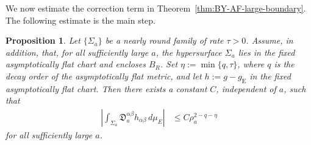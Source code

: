 \documentclass[10pt]{amsart}
\newcommand{\gE}{g_{\mathrm{E}}}
\theoremstyle{plain}
\newtheorem{proposition}[theorem]{Proposition}
\theoremstyle{remark}
\begin{document}
	We now estimate the correction term in
	Theorem~\ref{thm:BY-AF-large-boundary}. The following estimate is the
	main step.
	
	\begin{proposition}\label{prop:BY-nearly-round-correction}
		Let $\{\Sigma_a\}$ be a nearly round family of rate $\tau>0$.
		Assume, in addition, that, for all sufficiently large $a$, the
		hypersurface $\Sigma_a$ lies in the fixed asymptotically flat chart and
		encloses $B_R$. Set $\eta:=\min\{q,\tau\}$, where $q$ is the decay order
		of the asymptotically flat metric, and let $h:=g-\gE$ in the fixed
		asymptotically flat chart. Then there exists a constant $C$, independent
		of $a$, such that
		\begin{align}
			\label{eq:BY-nearly-round-correction-estimate}
			\left|
			\int_{\Sigma_a}
			\mathfrak D_a^{\alpha\beta}
			h_{\alpha\beta}\,d\mu_E
			\right|
			&\leq
			C\rho_a^{2-q-\eta}
		\end{align}
		for all sufficiently large $a$.
	\end{proposition}
	
\end{document}
